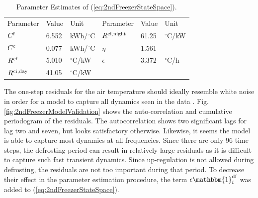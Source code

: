 \begin{table}[!t]
    \caption{Parameter Estimates of (\ref{eq:2ndFreezerStateSpace}).}
    \label{tab:parameter_estimates}
    \centering
    \begin{tabular}[b]{|l|l|l|l|l|l|}
        \hline
        Parameter                 & Value & Unit            & Parameter                   & Value & Unit           \\ \hhline{|=|=|=|=|=|=|}
        $C^{\rm{f}}$              & 6.552 & kWh/$^{\circ}$C & $R^{\rm{ci}, \text{night}}$ & 61.25 & $^{\circ}$C/kW \\
        $C^{\rm{c}}$              & 0.077 & kWh/$^{\circ}$C & $\eta$                      & 1.561 &                \\
        $R^{\rm{cf}}$             & 5.010 & $^{\circ}$C/kW  & $\epsilon$                  & 3.372 & $^{\circ}$C/h  \\
        $R^{\rm{ci}, \text{day}}$ & 41.05 & $^{\circ}$C/kW  &                             &       &                \\ \hline
    \end{tabular}
\end{table}





The one-step residuals for the air temperature should ideally resemble white noise in order for a model to capture all dynamics seen in the data \cite{madsen2007time}. Fig. \ref{fig:2ndFreezerModelValidation} shows the auto-correlation and cumulative periodogram of the residuals. The autocorrelation shows two significant lags for lag two and seven, but looks satisfactory otherwise. Likewise,  it seems the model is able to capture most dynamics at all frequencies.
%
Since there are only 96 time steps, the defrosting period can result in relatively large residuals as it is difficult to capture such fast transient dynamics. Since up-regulation is not allowed during defrosting, the residuals are not too important during that period. To decrease their effect in the parameter estimation procedure, the term $ \epsilon \mathbbm{1}^{\text{df}}_{t}$ was added to (\ref{eq:2ndFreezerStateSpace}).

